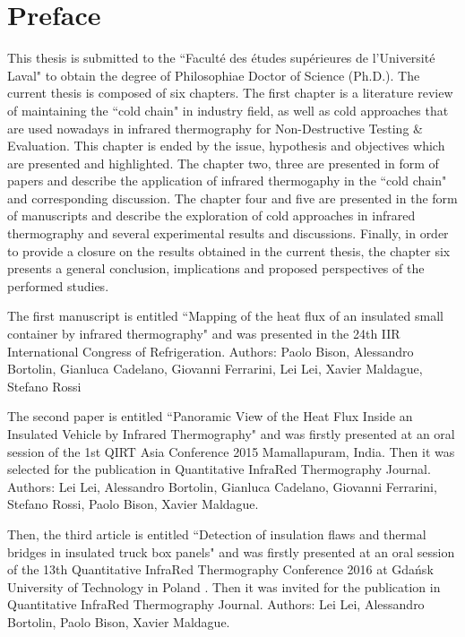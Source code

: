 \chapter*{Preface}         %

This thesis is submitted to the ``Faculté des études supérieures de l'Université Laval" to obtain the degree of Philosophiae Doctor of Science (Ph.D.). The current thesis is composed of six chapters. The first chapter is a literature review of maintaining the ``cold chain" in industry field, as well as cold approaches that are used nowadays in infrared thermography for Non-Destructive Testing \& Evaluation. This chapter is ended by the issue, hypothesis and objectives which are presented and highlighted. The chapter two, three are presented in form of papers and describe the application of infrared thermogaphy in the ``cold chain" and corresponding discussion. The chapter four and five are presented in the form of manuscripts and describe the exploration of cold approaches in infrared thermography and several experimental results and discussions. Finally, in order to provide a closure on the results obtained in the current thesis, the chapter six presents a general conclusion, implications and proposed perspectives of the performed studies.

The first manuscript is entitled ``Mapping of the heat flux of an insulated small container by infrared thermography" and was presented in the 24th IIR International Congress of Refrigeration. Authors: Paolo Bison, Alessandro Bortolin, Gianluca Cadelano, Giovanni Ferrarini, Lei Lei, Xavier Maldague, Stefano Rossi

The second paper is entitled ``Panoramic View of the Heat Flux Inside an Insulated Vehicle by Infrared Thermography" and was firstly presented at an oral session of the 1st QIRT Asia Conference 2015 Mamallapuram, India. Then it was selected for the publication in Quantitative InfraRed Thermography Journal. Authors: Lei Lei, Alessandro Bortolin, Gianluca Cadelano, Giovanni Ferrarini, Stefano Rossi, Paolo Bison, Xavier Maldague. 

Then, the third article is entitled ``Detection of insulation flaws and thermal bridges in insulated truck box panels" and was firstly presented at an oral session of the 13th Quantitative InfraRed Thermography Conference 2016 at Gdańsk University of Technology in Poland . Then it was invited for the publication in Quantitative InfraRed Thermography Journal. Authors: Lei Lei, Alessandro Bortolin, Paolo Bison, Xavier Maldague.

